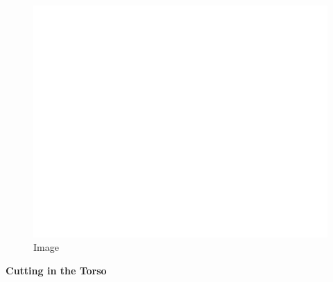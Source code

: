 \begin{figure}
\centering
\includegraphics{./images/combat06.svg}
\caption{Image}
\end{figure}

\textbf{Cutting in the Torso}

